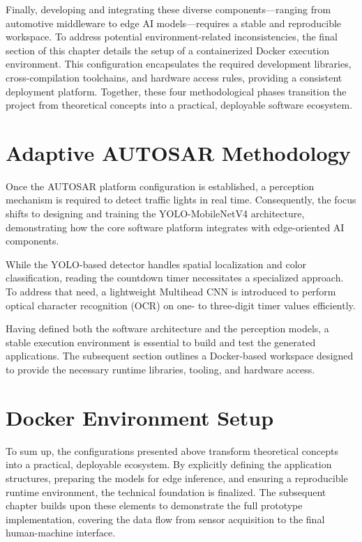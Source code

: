 Finally, developing and integrating these diverse components---ranging from automotive middleware to edge AI models---requires a stable and reproducible workspace. To address potential environment-related inconsistencies, the final section of this chapter details the setup of a containerized Docker execution environment. This configuration encapsulates the required development libraries, cross-compilation toolchains, and hardware access rules, providing a consistent deployment platform. Together, these four methodological phases transition the project from theoretical concepts into a practical, deployable software ecosystem.

\section{Adaptive AUTOSAR Methodology}
\label{sec:adaptive_methodology}


Once the AUTOSAR platform configuration is established, a perception mechanism is required to detect traffic lights in real time. Consequently, the focus shifts to designing and training the YOLO-MobileNetV4 architecture, demonstrating how the core software platform integrates with edge-oriented AI components.



While the YOLO-based detector handles spatial localization and color classification, reading the countdown timer necessitates a specialized approach. To address that need, a lightweight Multihead CNN is introduced to perform optical character recognition (OCR) on one- to three-digit timer values efficiently.



Having defined both the software architecture and the perception models, a stable execution environment is essential to build and test the generated applications. The subsequent section outlines a Docker-based workspace designed to provide the necessary runtime libraries, tooling, and hardware access.

\section{Docker Environment Setup}


To sum up, the configurations presented above transform theoretical concepts into a practical, deployable ecosystem. By explicitly defining the application structures, preparing the models for edge inference, and ensuring a reproducible runtime environment, the technical foundation is finalized. The subsequent chapter builds upon these elements to demonstrate the full prototype implementation, covering the data flow from sensor acquisition to the final human-machine interface.